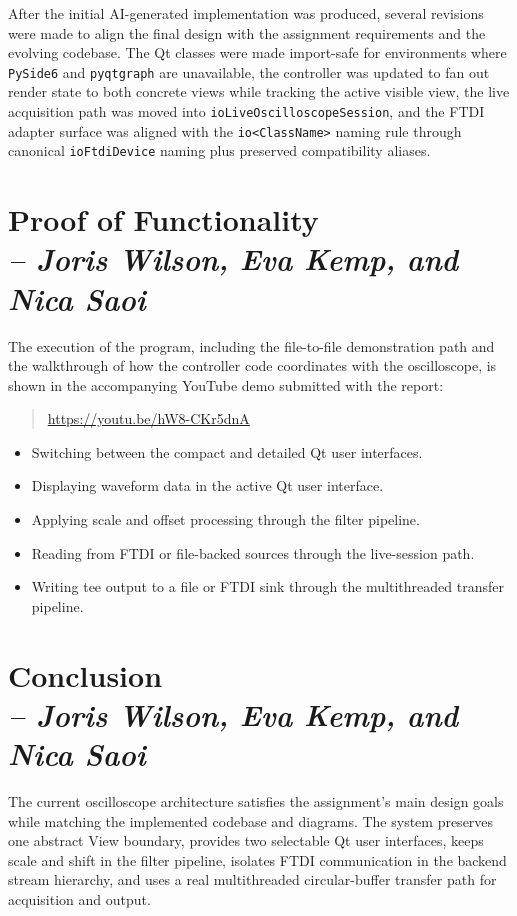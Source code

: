     After the initial AI-generated implementation was produced, several revisions were made to align the final design with the assignment requirements and the evolving codebase. The Qt classes were made import-safe for environments where \texttt{PySide6} and \texttt{pyqtgraph} are unavailable, the controller was updated to fan out render state to both concrete views while tracking the active visible view, the live acquisition path was moved into \texttt{ioLiveOscilloscopeSession}, and the FTDI adapter surface was aligned with the \texttt{io<ClassName>} naming rule through canonical \texttt{ioFtdiDevice} naming plus preserved compatibility aliases.

    \section{Proof of Functionality \\
    \small{\textit{-- Joris Wilson, Eva Kemp, and Nica Saoi}}}
    \label{Section::Proof of Functionality}

    The execution of the program, including the file-to-file demonstration path and the walkthrough of how the controller code coordinates with the oscilloscope, is shown in the accompanying YouTube demo submitted with the report:

    \begin{quote}
    \url{https://youtu.be/hW8-CKr5dnA}
    \end{quote}

    \begin{itemize}
        \item Switching between the compact and detailed Qt user interfaces.
        \item Displaying waveform data in the active Qt user interface.
        \item Applying scale and offset processing through the filter pipeline.
        \item Reading from FTDI or file-backed sources through the live-session path.
        \item Writing tee output to a file or FTDI sink through the multithreaded transfer pipeline.
    \end{itemize}

    \section{Conclusion \\
    \small{\textit{-- Joris Wilson, Eva Kemp, and Nica Saoi}}}
    \label{Section::Conclusion}

    The current oscilloscope architecture satisfies the assignment's main design goals while matching the implemented codebase and diagrams. The system preserves one abstract View boundary, provides two selectable Qt user interfaces, keeps scale and shift in the filter pipeline, isolates FTDI communication in the backend stream hierarchy, and uses a real multithreaded circular-buffer transfer path for acquisition and output.

